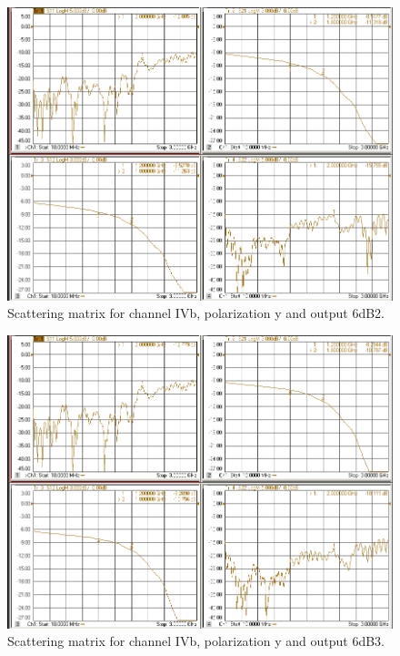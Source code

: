 \documentclass[12pt,a4paper,oneside]{article}
\begin{document}
\begin{figure}[H]
\centering
\includegraphics[width=0.9\linewidth]{VNA_results/IVby_6dB2.png}
\caption{Scattering matrix for channel IVb, polarization y and output 6dB2.}
\label{fig:IVby_6dB2}
\end{figure}


\begin{figure}[H]
\centering
\includegraphics[width=0.9\linewidth]{VNA_results/IVby_6dB3.png}
\caption{Scattering matrix for channel IVb, polarization y and output 6dB3.}
\label{fig:IVby_6dB3}
\end{figure}
\end{document}
